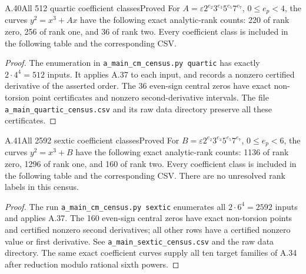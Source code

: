 \begin{statement}{A.40}{All 512 quartic coefficient classes}{Proved}
For $A=\varepsilon2^{e_2}3^{e_3}5^{e_5}7^{e_7}$, $0\leq e_p<4$,
the curves $y^2=x^3+Ax$ have the following exact analytic-rank counts:
220 of rank zero, 256 of rank one, and 36 of rank two. Every coefficient
class is included in the following table and the corresponding CSV.
\end{statement}
\begin{proof}
The enumeration in \texttt{a\_main\_cm\_census.py quartic} has exactly
$2\cdot4^4=512$ inputs. It applies A.37 to each input, and records a
nonzero certified derivative of the asserted order. The 36 even-sign
central zeros have exact non-torsion point certificates and nonzero
second-derivative intervals. The file
\texttt{a\_main\_quartic\_census.csv} and its raw data directory preserve
all these certificates.
\end{proof}


\begin{statement}{A.41}{All 2592 sextic coefficient classes}{Proved}
For $B=\varepsilon2^{e_2}3^{e_3}5^{e_5}7^{e_7}$, $0\leq e_p<6$,
the curves $y^2=x^3+B$ have the following exact analytic-rank counts:
1136 of rank zero, 1296 of rank one, and 160 of rank two. Every
coefficient class is included in the following table and the corresponding
CSV. There are no unresolved rank labels in this census.
\end{statement}
\begin{proof}
The run \texttt{a\_main\_cm\_census.py sextic} enumerates all
$2\cdot6^4=2592$ inputs and applies A.37. The 160 even-sign central
zeros have exact non-torsion points and certified nonzero second
derivatives; all other rows have a certified nonzero value or first
derivative. See \texttt{a\_main\_sextic\_census.csv} and the raw data
directory. The same exact coefficient curves supply all ten target
families of A.34 after reduction modulo rational sixth powers.
\end{proof}


